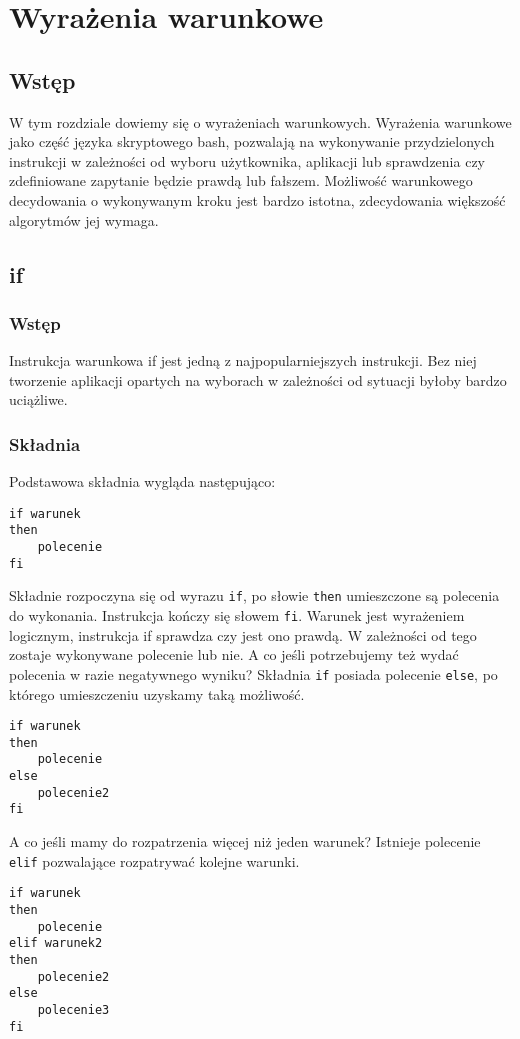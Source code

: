 \chapter{Wyrażenia warunkowe}
\section{Wstęp}
W tym rozdziale dowiemy się o wyrażeniach warunkowych. Wyrażenia warunkowe jako część języka skryptowego bash, pozwalają na wykonywanie przydzielonych instrukcji w zależności od wyboru użytkownika, aplikacji lub sprawdzenia czy zdefiniowane zapytanie będzie prawdą lub fałszem. Możliwość warunkowego decydowania o wykonywanym kroku jest bardzo istotna, zdecydowania większość algorytmów jej wymaga.
\section{if}
\subsection{Wstęp}
Instrukcja warunkowa if jest jedną z najpopularniejszych instrukcji. Bez niej tworzenie aplikacji opartych na wyborach w zależności od sytuacji byłoby bardzo uciążliwe.
\subsection{Składnia}
Podstawowa składnia wygląda następująco:
\begin{lstlisting}
if warunek
then
	polecenie
fi
\end{lstlisting}
Składnie rozpoczyna się od wyrazu \texttt{if}, po słowie \texttt{then} umieszczone są polecenia do wykonania. Instrukcja kończy się słowem \texttt{fi}. Warunek jest wyrażeniem logicznym, instrukcja if sprawdza czy jest ono prawdą. W zależności od tego zostaje wykonywane polecenie lub nie.\newline
A co jeśli potrzebujemy też wydać polecenia w razie negatywnego wyniku? Składnia \texttt{if} posiada polecenie \texttt{else}, po którego umieszczeniu uzyskamy taką możliwość.
\begin{lstlisting}
if warunek
then
	polecenie
else
	polecenie2
fi
\end{lstlisting}
A co jeśli mamy do rozpatrzenia więcej niż jeden warunek? Istnieje polecenie \texttt{elif} pozwalające rozpatrywać kolejne warunki.
\begin{lstlisting}
if warunek
then
	polecenie
elif warunek2
then
	polecenie2
else
	polecenie3
fi
\end{lstlisting}

